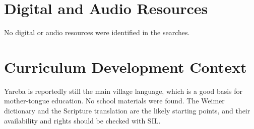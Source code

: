 \documentclass[12pt]{article}
\begin{document}
\section{Digital and Audio Resources}
No digital or audio resources were identified in the searches.

\section{Curriculum Development Context}
Yareba is reportedly still the main village language, which is a good basis for mother-tongue education. No school materials were found. The Weimer dictionary and the Scripture translation are the likely starting points, and their availability and rights should be checked with SIL.
\end{document}
